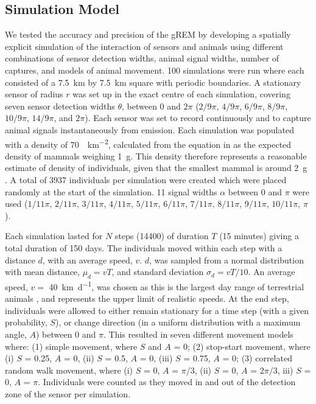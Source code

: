 \documentclass[a4paper,10pt,reqno,oneside]{amsart}
\begin{document}
\subsection*{Simulation Model}

We tested the accuracy and precision of the gREM by developing a spatially explicit simulation of the interaction of sensors and animals using different combinations of sensor detection widths, animal signal widths, number of captures, and models of animal movement. 100 simulations were run where each consisted of a  \SI{7.5}{\kilo\meter} by \SI{7.5}{\kilo\meter} square with periodic boundaries. A stationary sensor of radius $r$ was set up in the exact centre of each simulation, covering seven sensor detection widths $\theta$, between 0 and $2\pi$ ($2/9\pi$, $4/9\pi$, $6/9\pi$, $8/9\pi$, $10/9\pi$, $14/9\pi$, and $2\pi$). Each sensor was set to record continuously and to capture animal signals instantaneously from emission. Each simulation was populated with a density of \SI{70}{\animals\per\kilo\meter\squared}, calculated from the equation in \cite{damuth1981population} as the expected density of mammals weighing \SI{1}{\gram}. This density therefore represents a reasonable estimate of density of individuals, given that the smallest mammal is around \SI{2}{\gram} \citep{jones2009pantheria}. A total of 3937 individuals per simulation were created which were placed randomly at the start of the simulation. 11 signal widths $\alpha$ between 0 and $\pi$ were used ($1/11\pi$, $2/11\pi$, $3/11\pi$, $4/11\pi$, $5/11\pi$, $6/11\pi$, $7/11\pi$, $8/11\pi$, $9/11\pi$, $10/11\pi$, $\pi$). 

Each simulation lasted for $N$ steps (14400) of duration $T$ (15 minutes) giving a total duration of 150 days. The individuals moved within each step with a distance $d$, with an average speed, $v$. $d$, was sampled from a normal distribution with mean distance, $\mu_d = vT$, and standard deviation $\sigma_d = vT/10$. An average speed, $v = $ \SI{40}{\kilo\meter \per \day}, was chosen as this is the largest day range of terrestrial animals \citep{carbone2005far}, and represents the upper limit of realistic speeds. At the end step, individuals were allowed to either remain stationary for a time step (with a given probability, $S$), or change direction (in a uniform distribution with a maximum angle, $A$) between 0 and $\pi$. This resulted in seven different movement models where: (1) simple movement, where $S$ and $A$ = 0; (2) stop-start movement, where (i) $S$ = 0.25, $A$ = 0, (ii) $S$ = 0.5, $A$ = 0, (iii) $S$ = 0.75, $A$ = 0; (3) correlated random walk movement, where (i) $S$ = 0, $A$ = $\pi/3$, (ii) $S$ = 0, $A$ = $2\pi/3$, iii) $S$ = 0, $A$ = $\pi$. Individuals were counted as they moved in and out of the detection zone of the sensor per simulation. 
\end{document}
